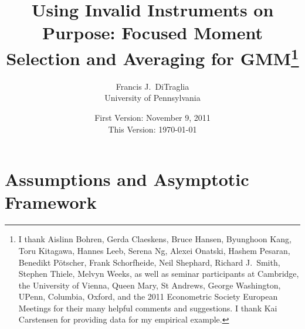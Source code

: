 \documentclass[12pt]{article}
\theoremstyle{definition}
\begin{document}
\title{Using Invalid Instruments on Purpose: Focused Moment Selection and Averaging for GMM\footnote{I thank Aislinn Bohren, Gerda Claeskens, Bruce Hansen, Byunghoon Kang, Toru Kitagawa, Hannes Leeb, Serena Ng, Alexei Onatski, Hashem Pesaran, Benedikt P\"{o}tscher, Frank Schorfheide, Neil Shephard,  Richard J.\ Smith, Stephen Thiele, Melvyn Weeks, as well as seminar participants at Cambridge, the University of Vienna, Queen Mary, St Andrews, George Washington, UPenn, Columbia, Oxford, and the 2011 Econometric Society European Meetings for their many helpful comments and suggestions. I thank Kai Carstensen for providing data for my empirical example.}}

\author{Francis J.\ DiTraglia \\ University of Pennsylvania}

\date{\normalsize First Version: November 9, 2011 \\ This Version: \today}

\maketitle 
\begin{abstract}
	
\end{abstract}



 

\section{Assumptions and Asymptotic Framework}
\label{sec:asymp}
\end{document}
